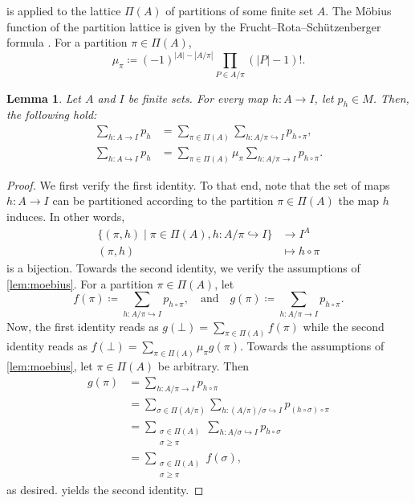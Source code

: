 \documentclass[11pt, DIV=15]{scrarticle}
\theoremstyle{definition}
\theoremstyle{plain}
\newtheorem{lemma}[definition]{Lemma}
\theoremstyle{remark}
\begin{document}
	 is applied to the lattice $\Pi(A)$ of partitions of some finite set $A$.
	The Möbius function of the partition lattice is given by 
	the Frucht--Rota--Schützenberger formula \cite[(A.2)]{lovasz_large_2012}.
	For a partition $\pi \in \Pi(A)$,
	\begin{equation}\label{eq:frs}
		\mu_{\pi} \coloneqq (-1)^{|A| - |A/\pi|} \prod_{ P \in A/\pi} (|P|-1)!.
	\end{equation}

	
	\begin{lemma} \label{lem:moebius-polynomial}
		Let $A$ and $I$ be finite sets. 
		For every map $h \colon A \to I$, let $p_h \in M$.
		Then, the following hold:
		\begin{align*}
			\sum_{h \colon A \to I} p_h &= \sum_{\pi \in \Pi(A)} \sum_{h \colon A/\pi \hookrightarrow I} p_{h \circ \pi}, \\
			\sum_{h \colon A \hookrightarrow I} p_h &= \sum_{\pi \in \Pi(A)} \mu_\pi \sum_{h \colon A/\pi \to I} p_{h \circ \pi}.
		\end{align*}
	\end{lemma}
	\begin{proof}
		We first verify the first identity.
		To that end, note that the set of maps $h \colon A \to I$ can be partitioned according to the partition $\pi \in \Pi(A)$ the map $h$ induces.
		In other words,
		\begin{align*}
			\{(\pi, h) \mid \pi \in \Pi(A), h \colon A/\pi \hookrightarrow I \} &\to I^A \\
			(\pi, h) & \mapsto h \circ \pi
		\end{align*}
		is a bijection.
		Towards the second identity, we verify the assumptions of \cref{lem:moebius}.
		For a partition $\pi \in \Pi(A)$,
		let
		\[
			f(\pi) \coloneqq \sum_{h \colon A/\pi \hookrightarrow I} p_{h \circ \pi}, \quad \text{and} \quad
			g(\pi) \coloneqq \sum_{h \colon A/\pi \to I} p_{h \circ \pi}.
		\]
		Now, the first identity reads as $g(\bot) = \sum_{\pi \in \Pi(A)} f(\pi)$
		while the second identity reads as $f(\bot) = \sum_{\pi \in \Pi(A)} \mu_\pi g(\pi)$.
		Towards the assumptions of \cref{lem:moebius}, let $\pi \in \Pi(A)$ be arbitrary.
		Then
		\begin{align*}
			g(\pi) &= \sum_{h \colon A/\pi \to I} p_{h \circ \pi} \\
				   &= \sum_{\sigma \in \Pi(A/\pi)} \sum_{h \colon (A/\pi)/\sigma \hookrightarrow I} p_{(h \circ \sigma) \circ \pi}  \\
				   &= \sum_{\substack{\sigma \in \Pi(A) \\ \sigma \geq \pi}} \sum_{h \colon A/\sigma \hookrightarrow I} p_{h \circ \sigma} \\
				   &= \sum_{\substack{\sigma \in \Pi(A) \\ \sigma \geq \pi}} f(\sigma),
		\end{align*}
		as desired.
		 yields the second identity.
	\end{proof}
	
\end{document}
